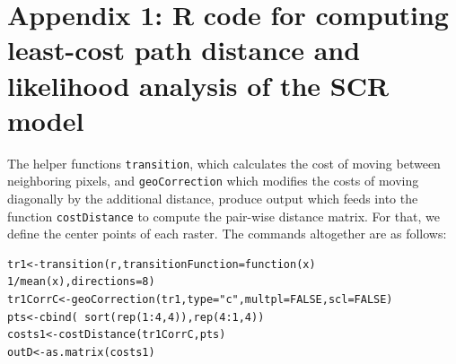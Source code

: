 \documentclass[12pt]{article}
\begin{document}


\section*{Appendix 1: {\bf R} code for computing least-cost path
  distance and likelihood analysis of the SCR model}

The helper functions \mbox{\tt transition}, which
calculates the cost of moving between neighboring pixels, and
\mbox{\tt geoCorrection} which modifies the costs of moving diagonally
by the additional distance, produce output which feeds into the
function \mbox{\tt costDistance} to compute the pair-wise distance
matrix. For that, we define the center points of each raster.  The
commands altogether are as follows:

\begin{verbatim}
tr1<-transition(r,transitionFunction=function(x) 1/mean(x),directions=8)
tr1CorrC<-geoCorrection(tr1,type="c",multpl=FALSE,scl=FALSE)
pts<-cbind( sort(rep(1:4,4)),rep(4:1,4))
costs1<-costDistance(tr1CorrC,pts)
outD<-as.matrix(costs1)
\end{verbatim}
\end{document}
